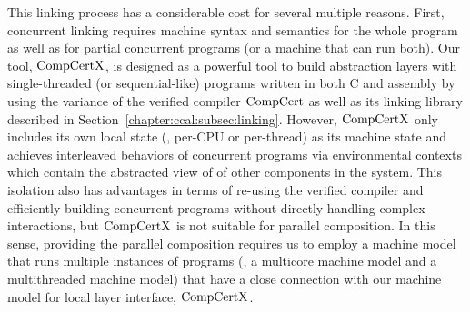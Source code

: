 This linking process has a considerable cost for several multiple reasons.
First, concurrent linking requires machine syntax and semantics 
for the whole program as well as for partial concurrent programs (or a machine that can run both).
Our tool, $\mathrm{CompCertX}$, is designed as a 
powerful tool to build abstraction layers with single-threaded (or sequential-like) programs
written in both C and assembly by using the variance of the verified compiler $\mathrm{CompCert}$ as well as its linking library described in Section~\ref{chapter:ccal:subsec:linking}. 
However, $\mathrm{CompCertX}$ only includes its own local state (\ie, per-CPU or per-thread) as its machine state and achieves interleaved behaviors of concurrent programs via environmental contexts which contain the abstracted view of of other components in the system.
This isolation also has advantages in terms of re-using the verified compiler and efficiently  building  concurrent programs without directly handling complex interactions, but $\mathrm{CompCertX}$ is not 
suitable for parallel composition.
In this sense, providing the parallel  composition requires us to 
 employ a machine model that runs multiple instances of programs (\ie, a multicore machine model and a multithreaded machine model)
 that have a close connection with our machine model for local layer interface, $\mathrm{CompCertX}$.
%
%


%


